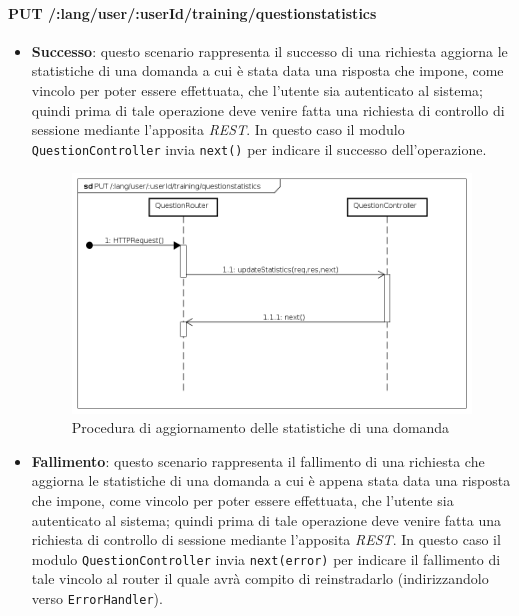 \paragraph{PUT /:lang/user/:userId/training/questionstatistics} %
\begin{itemize}
\item \textbf{Successo}: questo scenario rappresenta il successo di una richiesta aggiorna le statistiche di una domanda a cui è stata data una risposta che impone, come vincolo per poter essere effettuata, che l'utente sia autenticato al sistema; quindi prima di tale operazione deve venire fatta una richiesta di controllo di sessione mediante l'apposita \textit{REST}. In questo caso il modulo \texttt{QuestionController} invia \texttt{next()} per indicare il successo dell'operazione.

\begin{figure}[ht]
	\centering
	\includegraphics[scale=0.45]{UML/DiagrammiDiSequenza/Back-end/PUT__lang_user__userId_training_questionstatistics_success.png}
	\caption{Procedura di aggiornamento delle statistiche di una domanda}
\end{figure}
\FloatBarrier

\item \textbf{Fallimento}: questo scenario rappresenta il fallimento di una richiesta che aggiorna le statistiche di una domanda a cui è appena stata data una risposta che impone, come vincolo per poter essere effettuata, che l'utente sia autenticato al sistema; quindi prima di tale operazione deve venire fatta una richiesta di controllo di sessione mediante l'apposita \textit{REST}. In questo caso il modulo \texttt{QuestionController} invia \texttt{next(error)} per indicare il fallimento di tale vincolo al router il quale avrà compito di reinstradarlo (indirizzandolo verso \texttt{ErrorHandler}).


\end{itemize}
